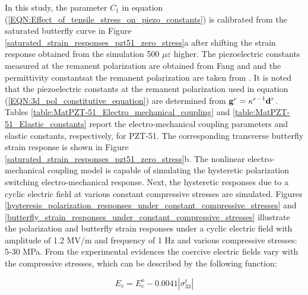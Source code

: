  
In this study, the parameter $C_1$ in equation
(\ref{EQN:Effect_of_tensile_stress_on_piezo_constants}) is calibrated from the saturated butterfly curve in Figure \ref{saturated_strain_responses_pzt51_zero_stress}a after shifting the strain response obtained from the simulation 500 $\mu \varepsilon$ higher.
The piezoelectric constants measured at the remanent polarization are obtained
from Fang and \cite{Li2004959} and the permittivity constantsat the remanent polarization are taken from \cite{Muliana2011}.
It is noted that the piezoelectric constants at the remanent polarization used in equation (\ref{EQN:3d_pol_constitutive_equation}) are determined from ${{\bf{g}}^r} = {{\mathbf{\kappa }}^r}^{ - 1}{{\bf{d}}^r}$. 
Tables \ref{table:MatPZT-51_Electro_mechanical_coupling} and \ref{table:MatPZT-51_Elastic_constants} report the electro-mechanical coupling parameters and elastic constants, respectively, for PZT-51. 
The corresponding transverse butterfly strain response is shown in Figure \ref{saturated_strain_responses_pzt51_zero_stress}b. 
The nonlinear electro-mechanical coupling model is capable of simulating the hysteretic polarization switching electro-mechanical response.
Next, the hysteretic responses due to a cyclic electric field at various constant compressive stresses are simulated. 
Figures \ref{hysteresis_polarization_responses_under_constant_compressive_stresses} and \ref{butterfly_strain_responses_under_constant_compressive_stresses} illustrate the polarization and butterfly strain responses under a cyclic electric field with amplitude of 1.2 MV/m and frequency of 1 Hz and various compressive stresses: 5-30 MPa. 
From the experimental evidences the coercive electric fields vary with the compressive stresses, which can be described by the following function:

\begin{equation}  
{E_c} = E_c^o - 0.0041\left| {\sigma _{33}^t} \right|
\label{EQN:effect_of_stress_on_coercive_field}
\end{equation}

